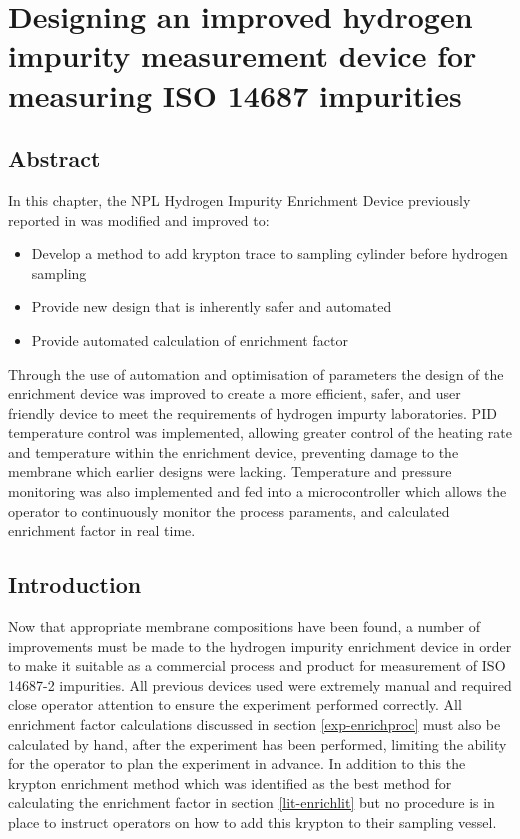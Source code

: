 \chapter{Designing an improved hydrogen impurity measurement device for measuring ISO 14687 impurities}

\section*{Abstract}
In this chapter, the NPL Hydrogen Impurity Enrichment Device previously reported in \cite{Murugan2014} was modified and improved to:
\begin{itemize}
    \item Develop a method to add krypton trace to sampling cylinder before hydrogen sampling
    \item Provide new design that is inherently safer and automated
    \item Provide automated calculation of enrichment factor
\end{itemize}

Through the use of automation and optimisation of parameters the design of the enrichment device was improved to create a more efficient, safer, and user friendly device to meet the requirements of hydrogen impurty laboratories. PID temperature control was implemented, allowing greater control of the heating rate and temperature within the enrichment device, preventing damage to the membrane which earlier designs were lacking. Temperature and pressure monitoring was also implemented and fed into a microcontroller which allows the operator to continuously monitor the process paraments, and calculated enrichment factor in real time. 

\section{Introduction}
Now that appropriate membrane compositions have been found, a number of improvements must be made to the hydrogen impurity enrichment device in order to make it suitable as a commercial process and product for measurement of ISO 14687-2 impurities. All previous devices used were extremely manual and required close operator attention to ensure the experiment performed correctly. All enrichment factor calculations discussed in section \ref{exp-enrichproc} must also be calculated by hand, after the experiment has been performed, limiting the ability for the operator to plan the experiment in advance. In addition to this the krypton enrichment method which was identified as the best method for calculating the enrichment factor in section \ref{lit-enrichlit} but no procedure is in place to instruct operators on how to add this krypton to their sampling vessel. 


